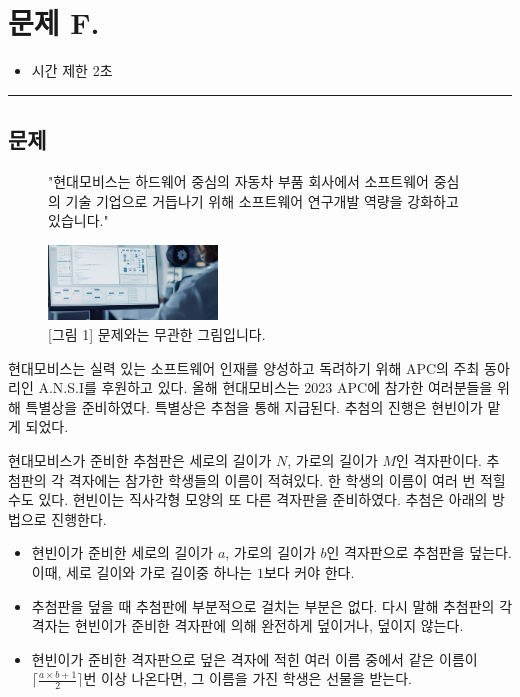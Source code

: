 \newpage
\section*{{\Large 문제 F.} }

\begin{itemize}
    \item 시간 제한 \tabto{2cm} 2초
\end{itemize}

\hrule

\subsection*{문제}

\begin{figure}[h]
    \centering
    \captionsetup{width=0.7\textwidth}
    \caption{\centering "현대모비스는 하드웨어 중심의 자동차 부품 회사에서 소프트웨어 중심의 기술 기업으로 거듭나기 위해 소프트웨어 연구개발 역량을 강화하고 있습니다."}
    
    \includegraphics[width=0.4\textwidth]{problems/image/mobis_lotto.png}
    
    \caption{[그림 1] 문제와는 무관한 그림입니다.}
\end{figure}

현대모비스는 실력 있는 소프트웨어 인재를 양성하고 독려하기 위해 APC의 주최 동아리인 A.N.S.I를 후원하고 있다. 올해 현대모비스는 2023 APC에 참가한 여러분들을 위해 특별상을 준비하였다. 특별상은 추첨을 통해 지급된다. 추첨의 진행은 현빈이가 맡게 되었다.

현대모비스가 준비한 추첨판은 세로의 길이가 $N$, 가로의 길이가 $M$인 격자판이다. 추첨판의 각 격자에는 참가한 학생들의 이름이 적혀있다. 한 학생의 이름이 여러 번 적힐 수도 있다. 현빈이는 직사각형 모양의 또 다른 격자판을 준비하였다. 추첨은 아래의 방법으로 진행한다.

\begin{itemize}
    \item 현빈이가 준비한 세로의 길이가 $a$, 가로의 길이가 $b$인 격자판으로 추첨판을 덮는다. 이때, 세로 길이와 가로 길이중 하나는 $1$보다 커야 한다.
    \item 추첨판을 덮을 때 추첨판에 부분적으로 걸치는 부분은 없다. 다시 말해 추첨판의 각 격자는 현빈이가 준비한 격자판에 의해 완전하게 덮이거나, 덮이지 않는다.
    \item 현빈이가 준비한 격자판으로 덮은 격자에 적힌 여러 이름 중에서 같은 이름이 $\lceil \frac{a\times b+1}{2}\rceil$번 이상 나온다면, 그 이름을 가진 학생은 선물을 받는다.
\end{itemize}

